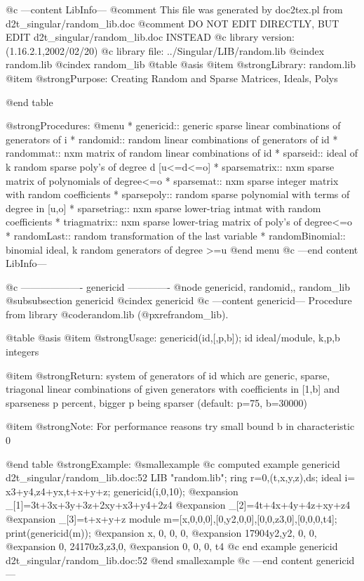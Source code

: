 @c ---content LibInfo---
@comment This file was generated by doc2tex.pl from d2t_singular/random_lib.doc
@comment DO NOT EDIT DIRECTLY, BUT EDIT d2t_singular/random_lib.doc INSTEAD
@c library version: (1.16.2.1,2002/02/20)
@c library file: ../Singular/LIB/random.lib
@cindex random.lib
@cindex random_lib
@table @asis
@item @strong{Library:}
random.lib
@item @strong{Purpose:}
    Creating Random and Sparse Matrices, Ideals, Polys

@end table

@strong{Procedures:}
@menu
* genericid:: generic sparse linear combinations of generators of i
* randomid:: random linear combinations of generators of id
* randommat:: nxm matrix of random linear combinations of id
* sparseid:: ideal of k random sparse poly's of degree d [u<=d<=o]
* sparsematrix:: nxm sparse matrix of polynomials of degree<=o
* sparsemat:: nxm sparse integer matrix with random coefficients
* sparsepoly:: random sparse polynomial with terms of degree in [u,o]
* sparsetriag:: nxm sparse lower-triag intmat with random coefficients
* triagmatrix:: nxm sparse lower-triag matrix of poly's of degree<=o
* randomLast:: random transformation of the last variable
* randomBinomial:: binomial ideal, k random generators of degree >=u
@end menu
@c ---end content LibInfo---

@c ------------------- genericid -------------
@node genericid, randomid,, random_lib
@subsubsection genericid
@cindex genericid
@c ---content genericid---
Procedure from library @code{random.lib} (@pxref{random_lib}).

@table @asis
@item @strong{Usage:}
genericid(id,[,p,b]); id ideal/module, k,p,b integers

@item @strong{Return:}
system of generators of id which are generic, sparse, triagonal linear
combinations of given generators with coefficients in [1,b] and
sparseness p percent, bigger p being sparser (default: p=75, b=30000)

@item @strong{Note:}
For performance reasons try small bound b in characteristic 0

@end table
@strong{Example:}
@smallexample
@c computed example genericid d2t_singular/random_lib.doc:52 
LIB "random.lib";
ring r=0,(t,x,y,z),ds;
ideal i= x3+y4,z4+yx,t+x+y+z;
genericid(i,0,10);
@expansion{} _[1]=3t+3x+3y+3z+2xy+x3+y4+2z4
@expansion{} _[2]=4t+4x+4y+4z+xy+z4
@expansion{} _[3]=t+x+y+z
module m=[x,0,0,0],[0,y2,0,0],[0,0,z3,0],[0,0,0,t4];
print(genericid(m));
@expansion{} x,      0,      0, 0,
@expansion{} 17904y2,y2,     0, 0,
@expansion{} 0,      24170z3,z3,0,
@expansion{} 0,      0,      0, t4
@c end example genericid d2t_singular/random_lib.doc:52
@end smallexample
@c ---end content genericid---

